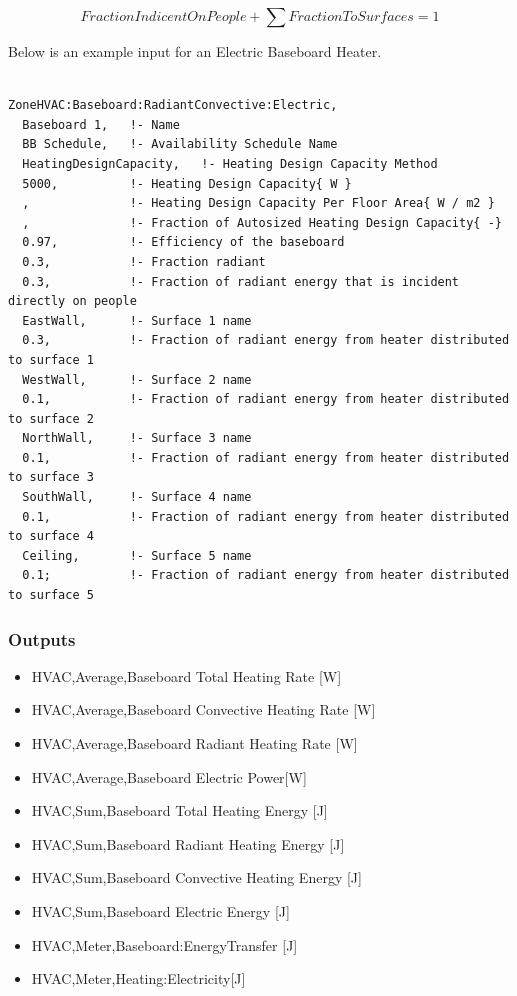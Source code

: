 \begin{equation}
FractionIndicentOnPeople + \sum {FractionToSurfaces = 1}
\end{equation}

Below is an example input for an Electric Baseboard Heater.

\begin{lstlisting}

ZoneHVAC:Baseboard:RadiantConvective:Electric,
  Baseboard 1,   !- Name
  BB Schedule,   !- Availability Schedule Name
  HeatingDesignCapacity,   !- Heating Design Capacity Method
  5000,          !- Heating Design Capacity{ W }
  ,              !- Heating Design Capacity Per Floor Area{ W / m2 }
  ,              !- Fraction of Autosized Heating Design Capacity{ -}
  0.97,          !- Efficiency of the baseboard
  0.3,           !- Fraction radiant
  0.3,           !- Fraction of radiant energy that is incident directly on people
  EastWall,      !- Surface 1 name
  0.3,           !- Fraction of radiant energy from heater distributed to surface 1
  WestWall,      !- Surface 2 name
  0.1,           !- Fraction of radiant energy from heater distributed to surface 2
  NorthWall,     !- Surface 3 name
  0.1,           !- Fraction of radiant energy from heater distributed to surface 3
  SouthWall,     !- Surface 4 name
  0.1,           !- Fraction of radiant energy from heater distributed to surface 4
  Ceiling,       !- Surface 5 name
  0.1;           !- Fraction of radiant energy from heater distributed to surface 5
\end{lstlisting}

\subsubsection{Outputs}\label{outputs-2-017}

\begin{itemize}
\item
  HVAC,Average,Baseboard Total Heating Rate {[}W{]}
\item
  HVAC,Average,Baseboard Convective Heating Rate {[}W{]}
\item
  HVAC,Average,Baseboard Radiant Heating Rate {[}W{]}
\item
  HVAC,Average,Baseboard Electric Power{[}W{]}
\item
  HVAC,Sum,Baseboard Total Heating Energy {[}J{]}
\item
  HVAC,Sum,Baseboard Radiant Heating Energy {[}J{]}
\item
  HVAC,Sum,Baseboard Convective Heating Energy {[}J{]}
\item
  HVAC,Sum,Baseboard Electric Energy {[}J{]}
\item
  HVAC,Meter,Baseboard:EnergyTransfer {[}J{]}
\item
  HVAC,Meter,Heating:Electricity{[}J{]}
\end{itemize}

